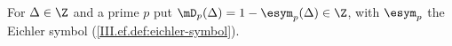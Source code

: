 For $\Delta\in\Z$ and a prime $p$ put $\mD_p(\Delta)=1-\esym_p(\Delta)\in\Z$, with $\esym_p$ the Eichler symbol (\cref{III.ef.def:eichler-symbol}).
